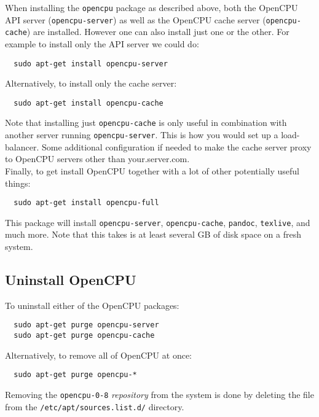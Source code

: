 \documentclass{scrartcl}\usepackage[]{graphicx}\usepackage[]{color}
\begin{document}
When installing the \texttt{opencpu} package as described above, both the OpenCPU API server (\texttt{opencpu-server}) as well as the OpenCPU cache server (\texttt{opencpu-cache}) are installed. However one can also install just one or the other. For example to install only the API server we could do:

\begin{verbatim}
  sudo apt-get install opencpu-server
\end{verbatim}
Alternatively, to install only the cache server:

\begin{verbatim}
  sudo apt-get install opencpu-cache
\end{verbatim}
Note that installing just \texttt{opencpu-cache} is only useful in combination with another server running \texttt{opencpu-server}. This is how you would set up a load-balancer. Some additional configuration if needed to make the cache server proxy to OpenCPU servers other than your.server.com. \\

\noindent Finally, to get install OpenCPU together with a lot of other potentially useful things:

\begin{verbatim}
  sudo apt-get install opencpu-full
\end{verbatim}
This package will install \texttt{opencpu-server}, \texttt{opencpu-cache}, \texttt{pandoc}, \texttt{texlive}, and much more. Note that this takes is at least several GB of disk space on a fresh system.

\subsection{Uninstall OpenCPU}

To uninstall either of the OpenCPU packages:

\begin{verbatim}
  sudo apt-get purge opencpu-server
  sudo apt-get purge opencpu-cache
\end{verbatim}
Alternatively, to remove all of OpenCPU at once:

\begin{verbatim}
  sudo apt-get purge opencpu-*
\end{verbatim}
  
\noindent Removing the \texttt{opencpu-0-8} \emph{repository} from the system is done by deleting the file from the \texttt{/etc/apt/sources.list.d/} directory.  
  
\end{document}

